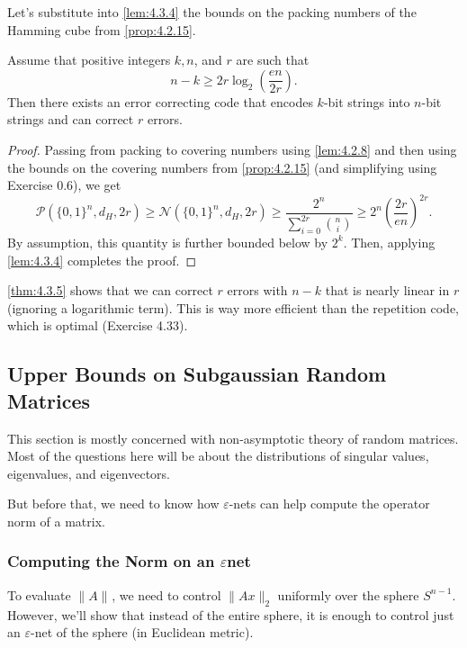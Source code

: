 Let's substitute into \cref{lem:4.3.4} the bounds on the packing numbers of the Hamming cube from 
\cref{prop:4.2.15}.

\begin{theorem}
\label{thm:4.3.5}
Assume that positive integers $k, n$, and $r$ are such that 
\[ n - k \geq 2r \log_{2}{\left( \frac{en}{2r} \right)}. \]
Then there exists an error correcting code that encodes $k$-bit strings into $n$-bit strings and can correct $r$ 
errors.
\end{theorem}

\begin{proof}
Passing from packing to covering numbers using \cref{lem:4.2.8} and then using the bounds on the covering 
numbers from \cref{prop:4.2.15} (and simplifying using Exercise 0.6), we get 
\[ \mathcal{P}(\{ 0, 1 \}^n, d_H, 2r) \geq \mathcal{N}(\{ 0, 1 \}^n, d_H, 2r) 
\geq \frac{2^n}{\sum_{i = 0}^{2r} \binom{n}{i}} \geq 2^n \left( \frac{2r}{en} \right)^{2r}. \]
By assumption, this quantity is further bounded below by $2^k$. Then, applying \cref{lem:4.3.4} completes the 
proof.
\end{proof}

\begin{remark}
\label{rmk:4.3.6}
\cref{thm:4.3.5} shows that we can correct $r$ errors with $n - k$ that is nearly linear in $r$ (ignoring a 
logarithmic term). This is way more efficient than the repetition code, which is optimal (Exercise 4.33).
\end{remark}



\subsection{Upper Bounds on Subgaussian Random Matrices}
This section is mostly concerned with non-asymptotic theory of random matrices. Most of the questions here 
will be about the distributions of singular values, eigenvalues, and eigenvectors.

But before that, we need to know how $\varepsilon$-nets can help compute the operator norm of a matrix.

\subsubsection{Computing the Norm on an \texorpdfstring{$\varepsilon$} -net}
To evaluate $\lVert A \rVert_{}$, we need to control $\lVert Ax \rVert_{2}$ uniformly over the sphere 
$S^{n - 1}$. However, we'll show that instead of the entire sphere, it is enough to control just an 
$\varepsilon$-net of the sphere (in Euclidean metric).

